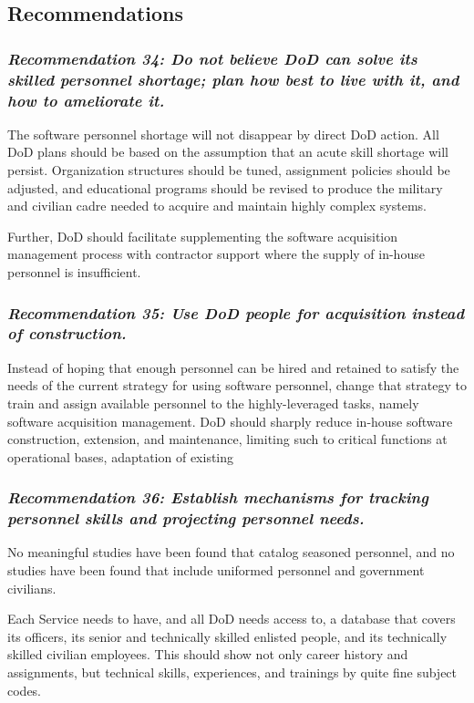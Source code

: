 \documentclass[12pt]{article}
\begin{document}
\subsection*{Recommendations}

\subsubsection*{\textit{Recommendation 34: Do not believe DoD can solve its
skilled personnel shortage; plan how best to live with it, and how to
ameliorate it.}}

The software personnel shortage will not disappear by direct DoD action. All
DoD plans should be based on the assumption that an acute skill shortage will
persist.  Organization structures should be tuned, assignment policies should
be adjusted, and educational programs should be revised to produce the military
and civilian cadre needed to acquire and maintain highly complex systems.

Further, DoD should facilitate supplementing the software acquisition
management process with contractor support where the supply of in-house
personnel is insufficient.

\subsubsection*{\textit{Recommendation 35: Use DoD people for acquisition
instead of construction.}}

Instead of hoping that enough personnel can be hired and retained to satisfy
the needs of the current strategy for using software personnel, change that
strategy to train and assign available personnel to the highly-leveraged tasks,
namely software acquisition management. DoD should sharply reduce in-house
software construction, extension, and maintenance, limiting such to critical
functions at operational bases, adaptation of existing

\subsubsection*{\textit{Recommendation 36: Establish mechanisms for tracking
personnel skills and projecting personnel needs.}}

No meaningful studies have been found that catalog seasoned personnel, and no
studies have been found that include uniformed personnel and government
civilians.

Each Service needs to have, and all DoD needs access to, a database that covers
its officers, its senior and technically skilled enlisted people, and its
technically skilled civilian employees. This should show not only career
history and assignments, but technical skills, experiences, and trainings by
quite fine subject codes.
\end{document}

